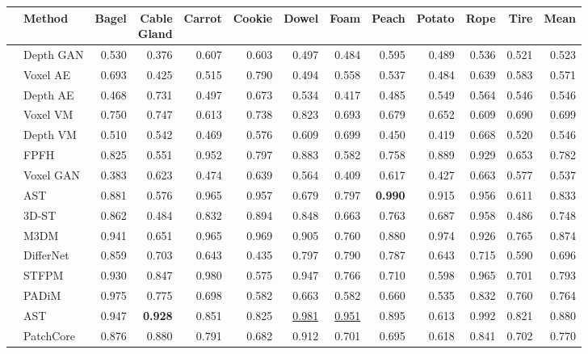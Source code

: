 \begin{table}[ht]
\centering
\begin{tabular}{cl|r|r|r|r|r|r|r|r|r|r|r}
\hline
& Method & Bagel & \makecell{Cable \\ Gland} & Carrot & Cookie & Dowel & Foam & Peach & Potato & Rope & Tire & Mean \\
\hline
\parbox[t]{0.5mm}{} & Depth GAN & 0.530 & 0.376 & 0.607 & 0.603 & 0.497 & 0.484 & 0.595 & 0.489 & 0.536 & 0.521 & 0.523 \\
& Voxel AE & 0.693 & 0.425 & 0.515 & 0.790 & 0.494 & 0.558 & 0.537 & 0.484 & 0.639 & 0.583 & 0.571 \\
& Depth AE & 0.468 & 0.731 & 0.497 & 0.673 & 0.534 & 0.417 & 0.485 & 0.549 & 0.564 & 0.546 & 0.546 \\
& Voxel VM & 0.750 & 0.747 & 0.613 & 0.738 & 0.823 & 0.693 & 0.679 & 0.652 & 0.609 & 0.690 & 0.699 \\
& Depth VM & 0.510 & 0.542 & 0.469 & 0.576 & 0.609 & 0.699 & 0.450 & 0.419 & 0.668 & 0.520 & 0.546 \\
& FPFH & 0.825 & 0.551 & 0.952 & 0.797 & 0.883 & 0.582 & 0.758 & 0.889 & 0.929 & 0.653 & 0.782 \\
& Voxel GAN & 0.383 & 0.623 & 0.474 & 0.639 & 0.564 & 0.409 & 0.617 & 0.427 & 0.663 & 0.577 & 0.537 \\
& AST & 0.881 & 0.576 & 0.965 & 0.957 & 0.679 & 0.797 & \textbf{0.990} & 0.915 & 0.956 & 0.611 & 0.833 \\
& 3D-ST & 0.862 & 0.484 & 0.832 & 0.894 & 0.848 & 0.663 & 0.763 & 0.687 & 0.958 & 0.486 & 0.748 \\
& M3DM & 0.941 & 0.651 & 0.965 & 0.969 & 0.905 & 0.760 & 0.880 & 0.974 & 0.926 & 0.765 & 0.874 \\
\hline
\parbox[t]{0.5mm}{} & DifferNet & 0.859 & 0.703 & 0.643 & 0.435 & 0.797 & 0.790 & 0.787 & 0.643 & 0.715 & 0.590 & 0.696 \\
& STFPM & 0.930 & 0.847 & 0.980 & 0.575 & 0.947 & 0.766 & 0.710 & 0.598 & 0.965 & 0.701 & 0.793 \\
& PADiM & 0.975 & 0.775 & 0.698 & 0.582 & 0.663 & 0.582 & 0.660 & 0.535 & 0.832 & 0.760 & 0.764 \\
& AST & 0.947 & \textbf{0.928} & 0.851 & 0.825 & \underline{0.981} & \underline{0.951} & 0.895 & 0.613 & 0.992 & 0.821 & 0.880 \\
& PatchCore & 0.876 & 0.880 & 0.791 & 0.682 & 0.912 & 0.701 & 0.695 & 0.618  & 0.841 & 0.702 & 0.770 \\

\end{tabular}
\end{table}
